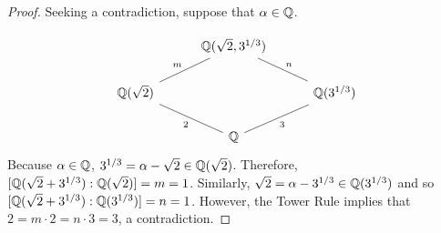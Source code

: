 \documentclass[../AlgebraQualSolutions.tex]{subfiles}
\begin{document}
\begin{proof}
	Seeking a contradiction, suppose that $\alpha \in \mathbb{Q}$.

	\[
		\begin{tikzcd}[column sep=1cm]
		  & \Q(\sqrt2,3^{1/3}) & \\
		  \Q(\sqrt2) \ar[ru, no head,"m"]& & \ar[lu, no head,"n"'] \Q(3^{1/3}) \\
		  & \Q \ar[lu, no head, "2"] \ar[ru, no head, "3"']&
		\end{tikzcd}
		\]
	Because $\alpha \in \mathbb{Q}$, $3^{1/3} = \alpha - \sqrt2 \in \mathbb{Q}(\sqrt2)$. Therefore, $[\mathbb{Q}(\sqrt2 + 3^{1/3}): \mathbb{Q}(\sqrt2)] = m = 1$. Similarly, $\sqrt{2} = \alpha - 3^{1/3} \in \mathbb{Q}(3^{1/3})$ and so $[\mathbb{Q}(\sqrt2 + 3^{1/3}): \mathbb{Q}(3^{1/3})] = n = 1$. However, the Tower Rule implies that $2 = m\cdot2 = n\cdot 3 = 3$, a contradiction. 
\end{proof}
\end{document}
